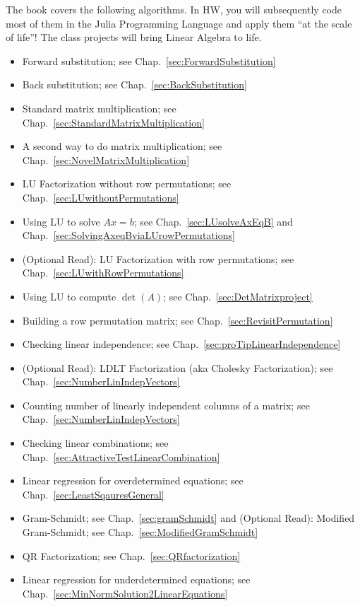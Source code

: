 
The book covers the following algorithms. In HW, you will subsequently code most of them in the Julia Programming Language and apply them ``at the scale of life''! The class projects will bring Linear Algebra to life.

\begin{itemize}
    \item Forward substitution; see Chap.~\ref{sec:ForwardSubstitution} 
    \item Back substitution; see Chap.~\ref{sec:BackSubstitution}
    \item Standard matrix multiplication; see Chap.~\ref{sec:StandardMatrixMultiplication}
    \item A second way to do matrix multiplication; see Chap.~\ref{sec:NovelMatrixMultiplication}
    \item LU Factorization without row permutations; see Chap.~\ref{sec:LUwithoutPermutations}
    \item Using LU to solve $Ax=b$; see Chap.~\ref{sec:LUsolveAxEqB} and Chap.~\ref{sec:SolvingAxeqBviaLUrowPermutations}
    \item (Optional Read): LU Factorization with row permutations; see Chap.~\ref{sec:LUwithRowPermutations}
    \item Using LU to compute $\det(A)$; see Chap.~\ref{sec:DetMatrixproject}
    \item Building a row permutation matrix; see Chap.~\ref{sec:RevisitPermutation}
    \item Checking linear independence; see Chap.~\ref{sec:proTipLinearIndependence}
    \item (Optional Read): LDLT Factorization (aka Cholesky Factorization); see Chap.~\ref{sec:NumberLinIndepVectors}
    \item Counting number of linearly independent columns of a matrix; see Chap.~\ref{sec:NumberLinIndepVectors}
    \item Checking linear combinations; see Chap.~\ref{sec:AttractiveTestLinearCombination}
    \item Linear regression for overdetermined equations; see Chap.~\ref{sec:LeastSqauresGeneral}
    \item Gram-Schmidt; see Chap.~\ref{sec:gramSchmidt} and (Optional Read): Modified Gram-Schmidt; see Chap.~\ref{sec:ModifiedGramSchmidt}
    \item QR Factorization; see Chap.~\ref{sec:QRfactorization}
    \item Linear regression for underdetermined equations; see Chap.~\ref{sec:MinNormSolution2LinearEquations}

\end{itemize}
